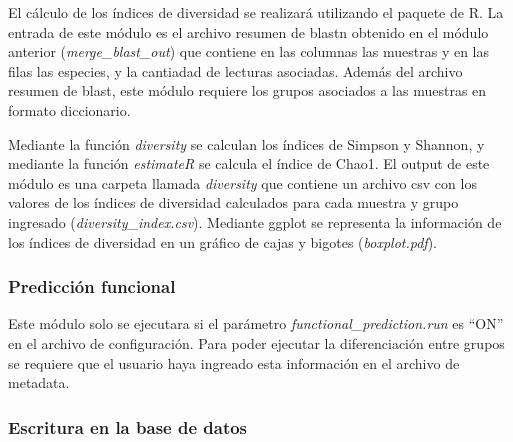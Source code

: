 \begin{itemize}
El cálculo de los índices de diversidad se realizará utilizando el paquete  de R.
La entrada de este módulo es el archivo resumen de blastn obtenido en el módulo anterior (\textit{merge\_blast\_out}) que contiene en las columnas las muestras y en las filas las especies, y la cantiadad de lecturas asociadas.
Además del archivo resumen de blast, este módulo requiere los grupos asociados a las muestras en formato diccionario.

Mediante la función \textit{diversity} se calculan los índices de Simpson y Shannon, y mediante la función \textit{estimateR} se calcula el índice de Chao1.
El output de este módulo es una carpeta llamada \textit{diversity} que contiene un archivo csv con los valores de los índices de diversidad calculados para cada muestra y grupo ingresado (\textit{diversity\_index.csv}). 
Mediante ggplot se representa la información de los índices de diversidad en un gráfico de cajas y bigotes (\textit{boxplot.pdf}).

\subsubsection{Predicción funcional}
Este módulo solo se ejecutara si el parámetro \textit{functional\_prediction.run} es ``ON'' en el archivo de configuración. 
Para poder ejecutar la diferenciación entre grupos se requiere que el usuario haya ingreado esta información en el archivo de metadata.


\subsubsection{Escritura en la base de datos}


\end{itemize}
